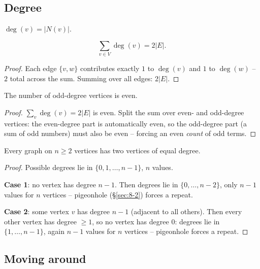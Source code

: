 \documentclass[11pt]{article}
\begin{document}
\subsection{Degree}
\label{sec:11-7}

\begin{definition}[Degree]
$\deg(v) = |N(v)|$.
\end{definition}

\begin{theorem}
\[
\sum_{v\in V} \deg(v) = 2|E|.
\]
\end{theorem}
\begin{proof}
Each edge $\{v,w\}$ contributes exactly $1$ to $\deg(v)$ and $1$ to $\deg(w)$ -- $2$ total across the sum. Summing over all edges: $2|E|$.
\end{proof}

\begin{corollary}
The number of odd-degree vertices is even.
\end{corollary}
\begin{proof}
$\sum_v\deg(v)=2|E|$ is even. Split the sum over even- and odd-degree vertices: the even-degree part is automatically even, so the odd-degree part (a sum of odd numbers) must also be even -- forcing an even \emph{count} of odd terms.
\end{proof}

\bigskip
\begin{theorem}
Every graph on $n\ge2$ vertices has two vertices of equal degree.
\end{theorem}
\begin{proof}
Possible degrees lie in $\{0,1,\dots,n-1\}$, $n$ values.

\textbf{Case 1}: no vertex has degree $n-1$. Then degrees lie in $\{0,\dots,n-2\}$, only $n-1$ values for $n$ vertices -- pigeonhole (\S\ref{sec:8-2}) forces a repeat.

\textbf{Case 2}: some vertex $v$ has degree $n-1$ (adjacent to all others). Then every other vertex has degree $\ge1$, so no vertex has degree $0$: degrees lie in $\{1,\dots,n-1\}$, again $n-1$ values for $n$ vertices -- pigeonhole forces a repeat.
\end{proof}

\subsection{Moving around}
\label{sec:11-8}
\end{document}
